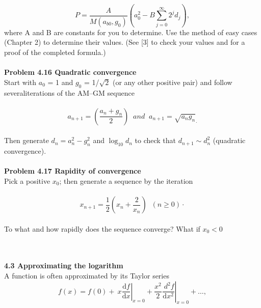 \documentclass{book}
\newcounter{pro1}
\begin{document}
\colorbox{light-gray}{
\begin{minipage}{\textwidth}
\begin {equation}\label{formula4.25}
P=\frac{A}{M(a_{b0},g_{0})}\left(a_0^2-B\sum_{j=0}^\infty 2^{j}d_{j}\right){,}
\end{equation}
\large\textrm{where A and B are constants for you to determine. Use the method of easy cases
(Chapter 2) to determine their values. (See [3] to check your values and for a
proof of the completed formula.)}\\
\\
\Large \textrm{\textbf{Problem 4.16 \;  Quadratic convergence}\\
Start with $a_{0}$ = 1 and $g_{0}$ = 1/$\sqrt{2}$ (or any other positive pair) and follow severaliterations of the AM–GM sequence}\\
\\
\begin {equation}\label{formula4.26}
a_{n+1}=\left(\frac{a_{n}+g_{n}}{2}\right)\;\;and\;\;a_{n+1}=\sqrt{a_{n}g_{n}}_\cdot
\end{equation}
\\
\large\textrm{Then generate $d_{n}=a_n^2-g_n^2$  and  $\log_{10}{d_{n}}$ to check that $d_{n+1}\sim d_n^2$ (quadratic convergence).}\\
\\
\Large \textrm{\textbf{Problem 4.17 \;  Rapidity of convergence}\\
Pick a positive $x_{0}$; then generate a sequence by the iteration}\\
\\
\begin {equation}\label{formula4.27}
x_{n+1}=\frac{1}{2}\left(x_{n}+\frac{2}{x_{n}}\right)\;\;(n\geq0)\cdot
\end{equation}
\\
\large\textrm{To what and how rapidly does the sequence converge? What if $x_{0}<0$}\\
\end{minipage}}\\
\\
\Large \textrm{\textbf{4.3 \; Approximating the logarithm}\\
A function is often approximated by its Taylor series}\\
\begin {equation}\label{formula4.28}
f(x)=f(0)+\left. \ x\frac{\text{d}f}{\text{d}x}\right|_{x=0}+\frac{x^{2}}{2}\left.\frac{\ d^{2}f}{\text{d}x^{2}}\right|_{x=0}+\dots{,}
\end{equation}
\end{document}
